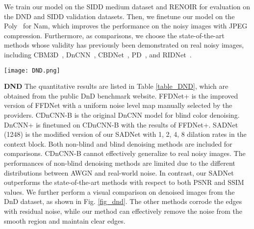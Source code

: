 \documentclass[runningheads]{llncs}
\begin{document}
We train our model on the SIDD medium dataset and RENOIR for evaluation on the DND and SIDD validation datasets. Then, we finetune our model on the Poly~\cite{xu2018real} for Nam, which improves the performance on the noisy images with JPEG compression.
Furthermore, as comparisons, we choose the state-of-the-art methods whose validity has previously been demonstrated on real noisy images, including CBM3D~\cite{dabov2007color}, DnCNN~\cite{zhang2017beyond}, CBDNet~\cite{guo2019toward}, PD~\cite{zhou2019awgn}, and RIDNet~\cite{anwar2019real}. 


\begin{figure*}[t]
\begin{center}
\texttt{[image: DND.png]}
\end{center}
\setlength{\abovecaptionskip}{0.cm}
   \caption{Real image denoising results from the DnD dataset.}
\label{fig_dnd}
\end{figure*}

\textbf{DND}
The quantitative results are listed in Table \ref{table_DND}, which are obtained from the public DnD benchmark website. FFDNet+ is the improved version of FFDNet with a uniform noise level map manually selected by the providers. CDnCNN-B is the original DnCNN model for blind color denoising. DnCNN+ is finetuned on CDnCNN-B with the results of FFDNet+. SADNet (1248) is the modified version of our SADNet with 1, 2, 4, 8 dilation rates in the context block. Both non-blind and blind denoising methods are included for comparisons. CDnCNN-B cannot effectively generalize to real noisy images. The performances of non-blind denoising methods are limited due to the different distributions between AWGN and real-world noise. In contrast, our SADNet outperforms the state-of-the-art methods with respect to both PSNR and SSIM values. We further perform a visual comparison on denoised images from the DnD dataset, as shown in Fig. \ref{fig_dnd}. The other methods corrode the edges with residual noise, while our method can effectively remove the noise from the smooth region and maintain clear edges.     
\end{document}
